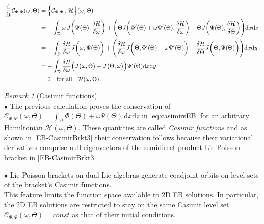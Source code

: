 \documentclass[11pt, oneside]{article}   	%
\numberwithin{equation}{section}
\theoremstyle{plain}
\theoremstyle{definition}
\theoremstyle{remark}
\newtheorem{remark}[theorem]{Remark}
\newcommand{\<}{\langle}
\renewcommand{\>}{\rangle}
\def\dt{\textnormal{dt}}
\newcommand{\mc}[1]{\mathcal{#1}}
\begin{document}
\begin{align}
  \begin{split}
 \frac{\mathrm{d}}{\dt} \mc{C}_{\Phi,\Psi}(\omega,\Theta)
 &=
\Big\{\mc{C}_{\Phi,\Psi}\,,\,{\mathcal{H}}\Big\}(\omega,\Theta)
\\&=-
\int_{\mathcal D} 
\omega \,J\bigg(\Psi(\Theta),\frac{\delta \mathcal{H}}{\delta \omega}\bigg)
+  \Bigg(\Theta J\bigg(\Phi'(\Theta)+\omega\Psi'(\Theta),\frac{\delta \mathcal{H}}{\delta \omega}\bigg)
- \Theta J\bigg(\Psi(\Theta),\frac{\delta \mathcal{H}}{\delta \Theta}\bigg)\Bigg) \mathrm{d}x\mathrm{d}z
\\&=-
\int_{\mathcal D} 
\frac{\delta \mathcal{H}}{\delta \omega}J\bigg(\omega ,\Psi(\Theta)\bigg)
+ \Bigg( \frac{\delta \mathcal{H}}{\delta \omega}J\bigg(\Theta,\Phi'(\Theta)+\omega\Psi'(\Theta)\bigg)
- \frac{\delta \mathcal{H}}{\delta \Theta}J\bigg(\Theta,\Psi(\Theta)\bigg)\Bigg) \mathrm{d}x \mathrm{d}y
\,.
\\&=-
\int_{\mathcal D} 
\frac{\delta \mathcal{H}}{\delta \omega}\Big(J\big(\omega ,\Theta\big)
+  J\big(\Theta,\omega\big)\Big)
\Psi'(\Theta) \mathrm{d}x \mathrm{d}y
\\& = 0 \quad\hbox{for all}\quad {\mathcal{H}}(\omega,\Theta)
\,.
\end{split}
\label{EB-CasimirBrkt3}
\end{align}

\begin{remark}[Casimir functions]$\,$\\
$\bullet$  The previous calculation proves the conservation of $\mc{C}_{\Phi,\Psi}(\omega,\Theta)= \int_{\mathcal D}\Phi(\Theta ) + \omega \Psi(\Theta )\,\mathrm{d}x\mathrm{d}z$ in \eqref{eq:casimirsEB} for an arbitrary Hamiltonian ${\mathcal{H}}(\omega,\Theta)$. These quantities are called \emph{Casimir functions} and as shown in \eqref{EB-CasimirBrkt3} their conservation follows because their variational derivatives comprise { null eigenvectors} of the semidirect-product Lie-Poisson bracket in \eqref{EB-CasimirBrkt3}. 
\smallskip

$\bullet$  Lie-Poisson brackets on dual Lie algebras generate coadjoint orbits on level sets of the bracket's Casimir functions. \\This feature limits the function space available to 2D EB solutions. In particular, the 2D EB solutions are restricted to stay on the same Casimir level set $\mc{C}_{\Phi,\Psi}(\omega ,\Theta)=const$ as that of their initial conditions.
\end{remark}
\end{document}
